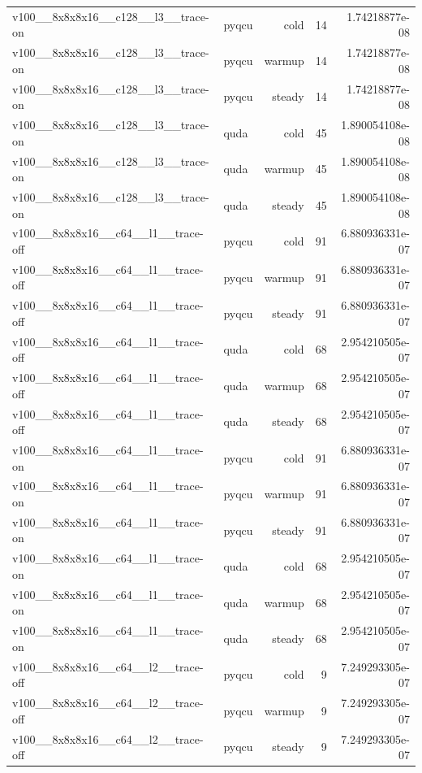 \begin{table}[htbp]
\begin{tabular}{@{}llrrr@{}}
v100\_\_8x8x8x16\_\_c128\_\_l3\_\_trace-on & pyqcu & cold & 14 & 1.74218877e-08 \\
v100\_\_8x8x8x16\_\_c128\_\_l3\_\_trace-on & pyqcu & warmup & 14 & 1.74218877e-08 \\
v100\_\_8x8x8x16\_\_c128\_\_l3\_\_trace-on & pyqcu & steady & 14 & 1.74218877e-08 \\
v100\_\_8x8x8x16\_\_c128\_\_l3\_\_trace-on & quda & cold & 45 & 1.890054108e-08 \\
v100\_\_8x8x8x16\_\_c128\_\_l3\_\_trace-on & quda & warmup & 45 & 1.890054108e-08 \\
v100\_\_8x8x8x16\_\_c128\_\_l3\_\_trace-on & quda & steady & 45 & 1.890054108e-08 \\
v100\_\_8x8x8x16\_\_c64\_\_l1\_\_trace-off & pyqcu & cold & 91 & 6.880936331e-07 \\
v100\_\_8x8x8x16\_\_c64\_\_l1\_\_trace-off & pyqcu & warmup & 91 & 6.880936331e-07 \\
v100\_\_8x8x8x16\_\_c64\_\_l1\_\_trace-off & pyqcu & steady & 91 & 6.880936331e-07 \\
v100\_\_8x8x8x16\_\_c64\_\_l1\_\_trace-off & quda & cold & 68 & 2.954210505e-07 \\
v100\_\_8x8x8x16\_\_c64\_\_l1\_\_trace-off & quda & warmup & 68 & 2.954210505e-07 \\
v100\_\_8x8x8x16\_\_c64\_\_l1\_\_trace-off & quda & steady & 68 & 2.954210505e-07 \\
v100\_\_8x8x8x16\_\_c64\_\_l1\_\_trace-on & pyqcu & cold & 91 & 6.880936331e-07 \\
v100\_\_8x8x8x16\_\_c64\_\_l1\_\_trace-on & pyqcu & warmup & 91 & 6.880936331e-07 \\
v100\_\_8x8x8x16\_\_c64\_\_l1\_\_trace-on & pyqcu & steady & 91 & 6.880936331e-07 \\
v100\_\_8x8x8x16\_\_c64\_\_l1\_\_trace-on & quda & cold & 68 & 2.954210505e-07 \\
v100\_\_8x8x8x16\_\_c64\_\_l1\_\_trace-on & quda & warmup & 68 & 2.954210505e-07 \\
v100\_\_8x8x8x16\_\_c64\_\_l1\_\_trace-on & quda & steady & 68 & 2.954210505e-07 \\
v100\_\_8x8x8x16\_\_c64\_\_l2\_\_trace-off & pyqcu & cold & 9 & 7.249293305e-07 \\
v100\_\_8x8x8x16\_\_c64\_\_l2\_\_trace-off & pyqcu & warmup & 9 & 7.249293305e-07 \\
v100\_\_8x8x8x16\_\_c64\_\_l2\_\_trace-off & pyqcu & steady & 9 & 7.249293305e-07 \\

\end{tabular}
\end{table}
